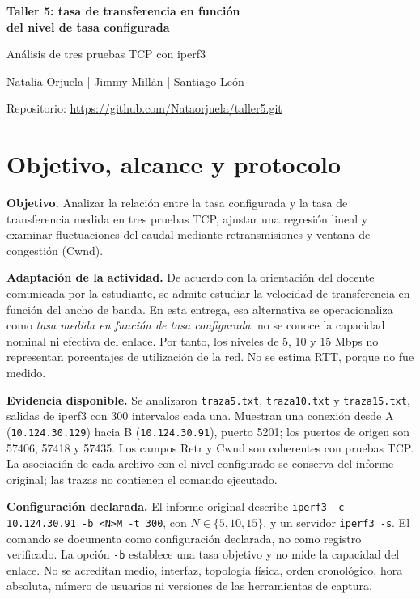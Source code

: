 \documentclass[11pt,letterpaper]{article}
\newcommand{\cod}[1]{\texttt{#1}}
\begin{document}
\spanishplainpercent
\begin{center}
{\Large\bfseries Taller 5: tasa de transferencia en función\\del nivel de tasa configurada}\par
{\normalsize Análisis de tres pruebas TCP con iperf3}\par
Natalia Orjuela \quad | \quad Jimmy Millán \quad | \quad Santiago León\par
{\normalsize Repositorio: \url{https://github.com/Nataorjuela/taller5.git}}
\end{center}

\section{Objetivo, alcance y protocolo}
\textbf{Objetivo.} Analizar la relación entre la tasa configurada y la tasa de transferencia medida en tres pruebas TCP, ajustar una regresión lineal y examinar fluctuaciones del caudal mediante retransmisiones y ventana de congestión (Cwnd).

\textbf{Adaptación de la actividad.} De acuerdo con la orientación del docente comunicada por la estudiante, se admite estudiar la velocidad de transferencia en función del ancho de banda. En esta entrega, esa alternativa se operacionaliza como \emph{tasa medida en función de tasa configurada}: no se conoce la capacidad nominal ni efectiva del enlace. Por tanto, los niveles de 5, 10 y 15 Mbps no representan porcentajes de utilización de la red. No se estima RTT, porque no fue medido.

\textbf{Evidencia disponible.} Se analizaron \cod{traza5.txt}, \cod{traza10.txt} y \cod{traza15.txt}, salidas de iperf3 con 300 intervalos cada una. Muestran una conexión desde A (\cod{10.124.30.129}) hacia B (\cod{10.124.30.91}), puerto 5201; los puertos de origen son 57406, 57418 y 57435. Los campos Retr y Cwnd son coherentes con pruebas TCP. La asociación de cada archivo con el nivel configurado se conserva del informe original; las trazas no contienen el comando ejecutado.

\textbf{Configuración declarada.} El informe original describe \cod{iperf3 -c 10.124.30.91 -b <N>M -t 300}, con $N\in\{5,10,15\}$, y un servidor \cod{iperf3 -s}. El comando se documenta como configuración declarada, no como registro verificado. La opción \cod{-b} establece una tasa objetivo y no mide la capacidad del enlace. No se acreditan medio, interfaz, topología física, orden cronológico, hora absoluta, número de usuarios ni versiones de las herramientas de captura.
\end{document}
